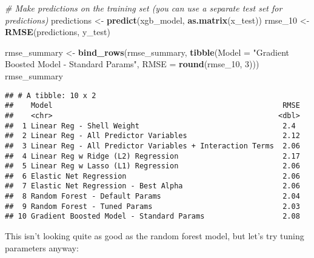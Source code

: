 \documentclass[
]{article}
\newenvironment{Shaded}{\begin{snugshade}}{\end{snugshade}}
\newcommand{\AttributeTok}[1]{\textcolor[rgb]{0.13,0.29,0.53}{#1}}
\newcommand{\CommentTok}[1]{\textcolor[rgb]{0.56,0.35,0.01}{\textit{#1}}}
\newcommand{\DecValTok}[1]{\textcolor[rgb]{0.00,0.00,0.81}{#1}}
\newcommand{\FunctionTok}[1]{\textcolor[rgb]{0.13,0.29,0.53}{\textbf{#1}}}
\newcommand{\NormalTok}[1]{#1}
\newcommand{\OtherTok}[1]{\textcolor[rgb]{0.56,0.35,0.01}{#1}}
\newcommand{\StringTok}[1]{\textcolor[rgb]{0.31,0.60,0.02}{#1}}
\begin{document}
\begin{Shaded}
\begin{Highlighting}[]
\CommentTok{\# Make predictions on the training set (you can use a separate test set for predictions)}
\NormalTok{predictions }\OtherTok{\textless{}{-}} \FunctionTok{predict}\NormalTok{(xgb\_model, }\FunctionTok{as.matrix}\NormalTok{(x\_test))}
\NormalTok{rmse\_10 }\OtherTok{\textless{}{-}} \FunctionTok{RMSE}\NormalTok{(predictions, y\_test)}

\NormalTok{rmse\_summary }\OtherTok{\textless{}{-}} \FunctionTok{bind\_rows}\NormalTok{(rmse\_summary,}
                          \FunctionTok{tibble}\NormalTok{(}\AttributeTok{Model =} \StringTok{"Gradient Boosted Model {-} Standard Params"}\NormalTok{,}
                                 \AttributeTok{RMSE =} \FunctionTok{round}\NormalTok{(rmse\_10, }\DecValTok{3}\NormalTok{)))}
\NormalTok{rmse\_summary}
\end{Highlighting}
\end{Shaded}

\begin{verbatim}
## # A tibble: 10 x 2
##    Model                                                     RMSE
##    <chr>                                                    <dbl>
##  1 Linear Reg - Shell Weight                                 2.4 
##  2 Linear Reg - All Predictor Variables                      2.12
##  3 Linear Reg - All Predictor Variables + Interaction Terms  2.06
##  4 Linear Reg w Ridge (L2) Regression                        2.17
##  5 Linear Reg w Lasso (L1) Regression                        2.06
##  6 Elastic Net Regression                                    2.06
##  7 Elastic Net Regression - Best Alpha                       2.06
##  8 Random Forest - Default Params                            2.04
##  9 Random Forest - Tuned Params                              2.03
## 10 Gradient Boosted Model - Standard Params                  2.08
\end{verbatim}

This isn't looking quite as good as the random forest model, but let's
try tuning parameters anyway:
\end{document}
